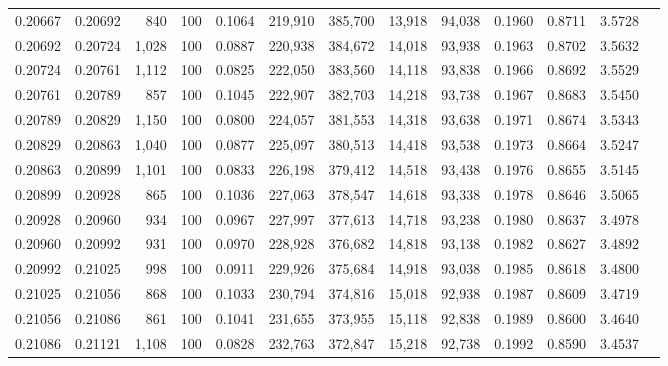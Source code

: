 \begin{tabular}{rrrrrrrrrrrrr}
0.20667 & 0.20692 &   840 & 100 &                                     0.1064 & 219,910 & 385,700 &  13,918 &  94,038 & 0.1960 & 0.8711 & 3.5728 \\
0.20692 & 0.20724 & 1,028 & 100 &                                     0.0887 & 220,938 & 384,672 &  14,018 &  93,938 & 0.1963 & 0.8702 & 3.5632 \\
0.20724 & 0.20761 & 1,112 & 100 &                                     0.0825 & 222,050 & 383,560 &  14,118 &  93,838 & 0.1966 & 0.8692 & 3.5529 \\
0.20761 & 0.20789 &   857 & 100 &                                     0.1045 & 222,907 & 382,703 &  14,218 &  93,738 & 0.1967 & 0.8683 & 3.5450 \\
0.20789 & 0.20829 & 1,150 & 100 &                                     0.0800 & 224,057 & 381,553 &  14,318 &  93,638 & 0.1971 & 0.8674 & 3.5343 \\
0.20829 & 0.20863 & 1,040 & 100 &                                     0.0877 & 225,097 & 380,513 &  14,418 &  93,538 & 0.1973 & 0.8664 & 3.5247 \\
0.20863 & 0.20899 & 1,101 & 100 &                                     0.0833 & 226,198 & 379,412 &  14,518 &  93,438 & 0.1976 & 0.8655 & 3.5145 \\
0.20899 & 0.20928 &   865 & 100 &                                     0.1036 & 227,063 & 378,547 &  14,618 &  93,338 & 0.1978 & 0.8646 & 3.5065 \\
0.20928 & 0.20960 &   934 & 100 &                                     0.0967 & 227,997 & 377,613 &  14,718 &  93,238 & 0.1980 & 0.8637 & 3.4978 \\
0.20960 & 0.20992 &   931 & 100 &                                     0.0970 & 228,928 & 376,682 &  14,818 &  93,138 & 0.1982 & 0.8627 & 3.4892 \\
0.20992 & 0.21025 &   998 & 100 &                                     0.0911 & 229,926 & 375,684 &  14,918 &  93,038 & 0.1985 & 0.8618 & 3.4800 \\
0.21025 & 0.21056 &   868 & 100 &                                     0.1033 & 230,794 & 374,816 &  15,018 &  92,938 & 0.1987 & 0.8609 & 3.4719 \\
0.21056 & 0.21086 &   861 & 100 &                                     0.1041 & 231,655 & 373,955 &  15,118 &  92,838 & 0.1989 & 0.8600 & 3.4640 \\
0.21086 & 0.21121 & 1,108 & 100 &                                     0.0828 & 232,763 & 372,847 &  15,218 &  92,738 & 0.1992 & 0.8590 & 3.4537 \\

\end{tabular}
